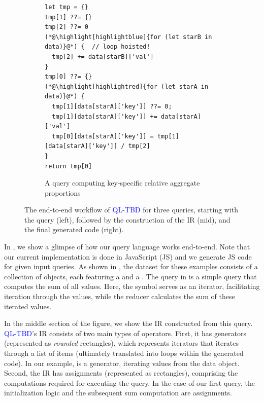 \documentclass[runningheads]{llncs}
\newcommand{\lang}{\textcolor{blue}{QL-TBD}}
\begin{document}
\begin{figure}[t!]
\begin{subfigure}{\textwidth}
\begin{minipage}{0.54\textwidth}
\begin{lstlisting}[style=JavaScript, columns=flexible]
let tmp = {}
tmp[1] ??= {}
tmp[2] ??= 0
(*@\highlight[highlightblue]{for (let starB in data)}@*) {  // loop hoisted!
  tmp[2] += data[starB]['val']
}
tmp[0] ??= {}
(*@\highlight[highlightred]{for (let starA in data)}@*) {
  tmp[1][data[starA]['key']] ??= 0;
  tmp[1][data[starA]['key']] += data[starA]['val']
  tmp[0][data[starA]['key']] = tmp[1][data[starA]['key']] / tmp[2]
}
return tmp[0]
\end{lstlisting}
\end{minipage}
\caption{A query computing key-specific relative aggregate proportions}\label{fig:intro_q3}
\end{subfigure}
\caption{
The end-to-end workflow of \lang{} for three queries, starting with the query (left),
followed by the construction of the IR (mid), and the final generated code (right).
}\label{fig:intro}
\end{figure}

In , we show a glimpse of how our query language works end-to-end.
Note that our current implementation is done in JavaScript (JS) and we generate JS
code for given input queries.
As shown in , the dataset for these examples consists of a collection
of objects, each featuring a  and a .
The query in  is a simple query that computes the sum of all
 values.
Here, the \inline{*} symbol serves as an iterator, facilitating iteration through
the  values, while the reducer  calculates the sum of
these iterated values.

In the middle section of the figure, we show the IR constructed from this query.
\lang{}'s IR consists of two main types of operators.
First, it has generators (represented as \emph{rounded} rectangles), which represents iterators
that iterates through a list of items (ultimately translated into loops within
the generated code).
In our example,  is a generator, iterating values from the data object.
Second, the IR has assignments (represented as rectangles), comprising the
computations required for executing the query.
In the case of our first query, the initialization logic  and
the subsequent sum computation  are assignments.
\end{document}
